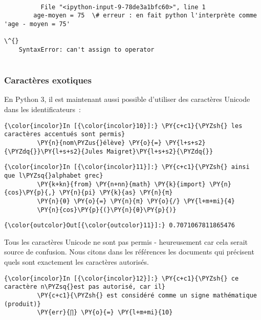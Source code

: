     \begin{Verbatim}[commandchars=\\\{\}]

          File "<ipython-input-9-78de3a1bfc60>", line 1
        age-moyen = 75  \# erreur : en fait python l'interprète comme 'age - moyen = 75'
                                                                                       \^{}
    SyntaxError: can't assign to operator


    \end{Verbatim}

    \hypertarget{caractuxe8res-exotiques}{%
\subsubsection{Caractères exotiques}\label{caractuxe8res-exotiques}}

    En Python 3, il est maintenant aussi possible d'utiliser des caractères
Unicode dans les identificateurs~:

    \begin{Verbatim}[commandchars=\\\{\}]
{\color{incolor}In [{\color{incolor}10}]:} \PY{c+c1}{\PYZsh{} les caractères accentués sont permis}
         \PY{n}{nom\PYZus{}élève} \PY{o}{=} \PY{l+s+s2}{\PYZdq{}}\PY{l+s+s2}{Jules Maigret}\PY{l+s+s2}{\PYZdq{}}
\end{Verbatim}


    \begin{Verbatim}[commandchars=\\\{\}]
{\color{incolor}In [{\color{incolor}11}]:} \PY{c+c1}{\PYZsh{} ainsi que l\PYZsq{}alphabet grec}
         \PY{k+kn}{from} \PY{n+nn}{math} \PY{k}{import} \PY{n}{cos}\PY{p}{,} \PY{n}{pi} \PY{k}{as} \PY{n}{π}
         \PY{n}{θ} \PY{o}{=} \PY{n}{π} \PY{o}{/} \PY{l+m+mi}{4}
         \PY{n}{cos}\PY{p}{(}\PY{n}{θ}\PY{p}{)}
\end{Verbatim}


\begin{Verbatim}[commandchars=\\\{\}]
{\color{outcolor}Out[{\color{outcolor}11}]:} 0.7071067811865476
\end{Verbatim}
            
    Tous les caractères Unicode ne sont pas permis - heureusement car cela
serait source de confusion. Nous citons dans les références les
documents qui précisent quels sont exactement les caractères autorisés.

    \begin{Verbatim}[commandchars=\\\{\}]
{\color{incolor}In [{\color{incolor}12}]:} \PY{c+c1}{\PYZsh{} ce caractère n\PYZsq{}est pas autorisé, car il}
         \PY{c+c1}{\PYZsh{} est considéré comme un signe mathématique (produit)}
         \PY{err}{∏} \PY{o}{=} \PY{l+m+mi}{10}
\end{Verbatim}


